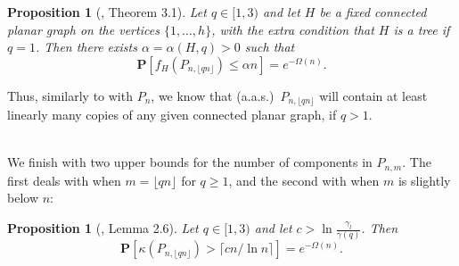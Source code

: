\documentclass{article}
\newtheorem{Proposition}[Theorem]{Proposition}
\newtheorem{Proof of Theorem}{Proof of Theorem}
\begin{document}
\begin{Proposition}[\cite{ger}, Theorem 3.1] \label{ger T3.1}
Let $q \in [1,3)$ and let $H$ be a fixed connected planar graph on the vertices $\{1, \ldots ,h\}$, 
with the extra condition that $H$ is a tree if $ q=1$.
Then there exists $\alpha= \alpha(H,q)>0$ such that 
\begin{displaymath}
\mathbf{P} \left[f_{H} \left( P_{n, \lfloor qn \rfloor} \right) \leq \alpha n \right] = e^{- \Omega (n)}. 
\end{displaymath} 
\end{Proposition} 
\phantom{p} 






Thus, similarly to with $P_{n}$, we know that (a.a.s.)~$P_{n, \lfloor qn \rfloor}$ 
will contain at least linearly many copies of any given connected planar graph, if $q>1$.

\begin{displaymath}
\end{displaymath} \\















We finish with two upper bounds for the number of components in $P_{n,m}$.
The first deals with when $m = \lfloor qn \rfloor$ for $q \geq 1$,
and the second with when $m$ is slightly below $n$: \\















\begin{Proposition}[\cite{ger}, Lemma 2.6] \label{ger L2.6}
Let $q \in [1,3)$
and let $c > \ln \frac{\gamma_{l}}{\gamma(q)}$.
Then
\begin{displaymath}
\mathbf{P} \left[ \kappa \left( P_{n, \lfloor qn \rfloor} \right) > \lceil cn/ \ln n \rceil \right] = e^{-\Omega(n)}.
\end{displaymath} 
\end{Proposition}
\phantom{p}
\end{document}
